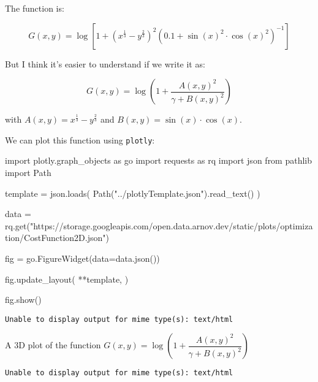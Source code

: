 \documentclass[
  letterpaper,
  DIV=11,
  numbers=noendperiod]{scrreprt}
\newenvironment{Shaded}{\begin{snugshade}}{\end{snugshade}}
\newcommand{\ImportTok}[1]{\textcolor[rgb]{0.00,0.46,0.62}{#1}}
\newcommand{\NormalTok}[1]{\textcolor[rgb]{0.00,0.23,0.31}{#1}}
\newcommand{\OperatorTok}[1]{\textcolor[rgb]{0.37,0.37,0.37}{#1}}
\newcommand{\StringTok}[1]{\textcolor[rgb]{0.13,0.47,0.30}{#1}}
\begin{document}
The function is:

\[G(x,y) = \log\left[1+\left(x^{\frac{1}{3}} - y^{\frac{2}{3}}\right)^2\left(0.1+\sin \left(x\right)^2\cdot \cos \left(x\right)^2\right)^{-1}\right]
\]

But I think it's easier to understand if we write it as:

\[ G(x,y) = \log\left(1 + \dfrac{A(x,y)^2}{\gamma + B(x,y)^2}\right)\]

with \(A(x,y) = x^{\frac{1}{3}} - y^{\frac{2}{3}}\) and
\(B(x,y) = \sin \left(x\right)\cdot \cos \left(x\right)\).

We can plot this function using \texttt{plotly}:

\begin{Shaded}
\begin{Highlighting}[]
\ImportTok{import}\NormalTok{ plotly.graph\_objects }\ImportTok{as}\NormalTok{ go}
\ImportTok{import}\NormalTok{ requests }\ImportTok{as}\NormalTok{ rq}
\ImportTok{import}\NormalTok{ json}
\ImportTok{from}\NormalTok{ pathlib }\ImportTok{import}\NormalTok{ Path}

\NormalTok{template }\OperatorTok{=}\NormalTok{ json.loads(}
\NormalTok{    Path(}\StringTok{"../plotlyTemplate.json"}\NormalTok{).read\_text()}
\NormalTok{)}



\NormalTok{data }\OperatorTok{=}\NormalTok{ rq.get(}\StringTok{"https://storage.googleapis.com/open.data.arnov.dev/static/plots/optimization/CostFunction2D.json"}\NormalTok{)}

\NormalTok{fig }\OperatorTok{=}\NormalTok{ go.FigureWidget(data}\OperatorTok{=}\NormalTok{data.json())}

\NormalTok{fig.update\_layout(}
    \OperatorTok{**}\NormalTok{template,}
\NormalTok{)}

\NormalTok{fig.show()}
\end{Highlighting}
\end{Shaded}

\begin{verbatim}
Unable to display output for mime type(s): text/html
\end{verbatim}

A 3D plot of the function
\(G(x,y) = \log\left(1 + \dfrac{A(x,y)^2}{\gamma + B(x,y)^2}\right)\)

\begin{verbatim}
Unable to display output for mime type(s): text/html
\end{verbatim}

\end{document}
